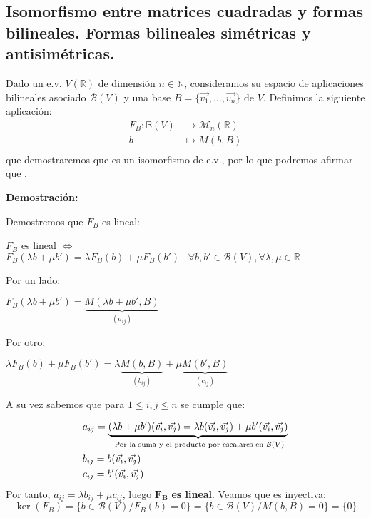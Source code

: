 \documentclass[x11names,table]{report}
\begin{document}
\subsection*{Isomorfismo entre matrices cuadradas y formas bilineales. Formas bilineales simétricas y antisimétricas.}

Dado un e.v. $V(\mathbb{R})$ de dimensión $n\in\mathbb{N}$, consideramos su espacio de aplicaciones bilineales asociado $\mathcal{B}(V)$ y una base $B=\{\vec{v_1},\dots,\vec{v_n}\}$ de $V$. Definimos la siguiente aplicación:
\begin{align*}
F_B:\mathbb{B}(V)&\longrightarrow\mathcal{M}_n(\mathbb{R})\\
b & \longmapsto M(b,B)\\
\end{align*}
que demostraremos que es un isomorfismo de e.v., por lo que podremos afirmar que .
\newpage

\textbf{Demostración:}

Demostremos que $F_B$ es lineal:

$F_B$ es lineal $\Leftrightarrow$ $F_B(\lambda b+\mu b')=\lambda F_B(b)+\mu F_B(b') \hspace{10pt} \forall b,b'\in \mathcal{B}(V), \forall \lambda,\mu\in\mathbb{R}$

Por un lado:

$F_B(\lambda b+\mu b')=\underbrace{M(\lambda b+\mu b',B)}_{(a_{ij})}$

Por otro:

$\lambda F_B(b)+\mu F_B(b')=\lambda \underbrace{M(b,B)}_{(b_{ij})}+\mu \underbrace{M(b',B)}_{(c_{ij})}$

A su vez sabemos que para $1\leq i,j\leq n$ se cumple que:

\begin{align*}
 & a_{ij}=\underbrace{(\lambda b + \mu b')(\vec{v_i},\vec{v_j})=\lambda b(\vec{v_i},\vec{v_j})+\mu b'(\vec{v_i},\vec{v_j})}_{\text{ \scriptsize{Por la suma y el producto por escalares en }}\scriptstyle{\mathcal{B}(V)}} \\
 & b_{ij}=b(\vec{v_i},\vec{v_j}) \\
 & c_{ij}=b'(\vec{v_i},\vec{v_j}) \\
\end{align*}
Por tanto, $a_{ij}=\lambda b_{ij}+\mu c_{ij}$, luego $\mathbf{F_B}$ \textbf{es lineal}. Veamos que es inyectiva:
\[
\ker(F_B)=\{b\in \mathcal{B}(V)/F_B(b)=0\}=\{b\in \mathcal{B}(V)/M(b,B)=0\}=\{0\}
\]
\end{document}
